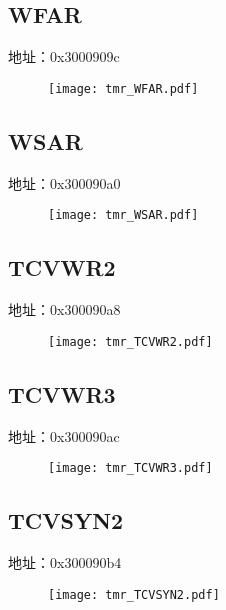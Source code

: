 \subsection{WFAR}
\label{tmr-WFAR}
地址：0x3000909c
 \begin{figure}[H]
\texttt{[image: tmr\_WFAR.pdf]}
\end{figure}

\subsection{WSAR}
\label{tmr-WSAR}
地址：0x300090a0
 \begin{figure}[H]
\texttt{[image: tmr\_WSAR.pdf]}
\end{figure}

\subsection{TCVWR2}
\label{tmr-TCVWR2}
地址：0x300090a8
 \begin{figure}[H]
\texttt{[image: tmr\_TCVWR2.pdf]}
\end{figure}

\subsection{TCVWR3}
\label{tmr-TCVWR3}
地址：0x300090ac
 \begin{figure}[H]
\texttt{[image: tmr\_TCVWR3.pdf]}
\end{figure}

\subsection{TCVSYN2}
\label{tmr-TCVSYN2}
地址：0x300090b4
 \begin{figure}[H]
\texttt{[image: tmr\_TCVSYN2.pdf]}
\end{figure}

